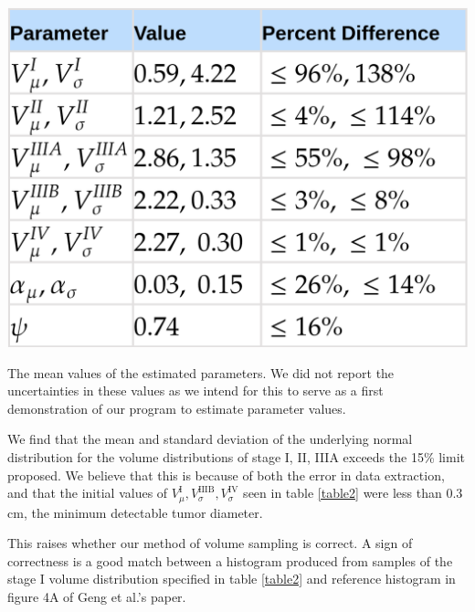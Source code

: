 \documentclass[letterpaper
, superscriptaddress
, twocolumn
, aps
]{revtex4}
\begin{document}
\begin{table}[h]
	\includegraphics[width=0.80\columnwidth]{Figures/result.png}
	\caption{The mean values of the estimated parameters. We did not report the uncertainties in these values as we intend for this to serve as a first demonstration of our program to estimate parameter values.}
\end{table}

We find that the mean and standard deviation of the underlying normal distribution for the volume distributions of stage I, II, IIIA exceeds the 15\% limit proposed. We believe that this is because of both the error in data extraction, and that the initial values of $V_{\mu}^{\text{I}}, V_{\sigma}^{\text{IIIB}}, V_{\sigma}^{\text{IV}}$ seen in table \ref{table2} were less than $0.3$ cm, the minimum detectable tumor diameter.

This raises whether our method of volume sampling is correct. A sign of correctness is a good match between a histogram produced from samples of the stage I volume distribution specified in table \ref{table2} and reference histogram in figure 4A of Geng et al.'s paper. 
\end{document}
